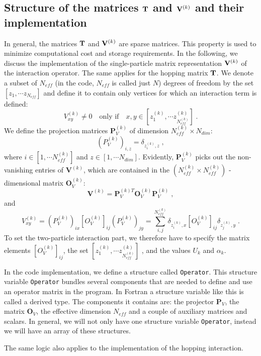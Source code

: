 \subsection{Structure of the matrices ${\bf T}$ and ${\bf V}^{(k)}$ and their implementation}

In general, the matrices ${\bf T}$ and ${\bf V}^{(k)}$ are sparse matrices. 
This property is used to minimize computational cost and storage requirements.
In the following, we discuss the implementation of the single-particle matrix representation ${\bf V}^{(k)}$ of the interaction operator. 
The same applies for the hopping matrix ${\bf T}$.
We denote a subset of $N_{eff}$ (in the code, $N_{eff}$ is called just $N$) degrees of freedom  by the set  $[z_{1},\cdots  z_{N_{eff}}]$ and define it to contain only vertices for which an interaction term is defined:
\begin{equation}
V^{(k)}_{x y}\neq 0\quad \text{only if} \quad x,y \in [z_{1}^{(k)},\cdots  z_{N_{eff}^{(k)}}^{(k)}]\;.
\end{equation}
We define the projection matrices $\mathbf{P}^{(k)}_{V}$ of dimension $N_{eff}^{(k)}\times N_{dim}$:
\begin{equation}
(P_{V}^{(k)})_{i,z}=\delta_{z_{i}^{(k)},z}\;,
\end{equation}
where $i\in [1,\cdots N_{eff}^{(k)}]$ and $z\in [1,\cdots N_{dim}]$. Evidently, $\bm{P}^{(k)}_{V}$ picks out the non-vanishing entries of $\bm{V}^{(k)}$, 
which are contained in the $(N_{eff}^{(k)}\times N_{eff}^{(k)})$ - dimensional matrix $\bm{O}_{V}^{(k)}$:
\begin{equation}
\bm{V}^{(k)}=\bm{P}^{(k) T}_{V} \bm{O}_{V}^{(k)}\bm{P}^{(k)}_{V}\;,
\end{equation}
and
\begin{equation}
V_{xy}^{(k)}=(P^{(k)}_{V})_{ix} \left[O_{V}^{(k)}\right]_{ij}(P_{V}^{(k)})_{jy}=\sum\limits_{i,j}^{N_{eff}^{(k)}} \delta_{z_{i}^{(k)},x}  \left[O_{V}^{(k)}\right]_{ij} \delta_{z_{j}^{(k)},y} \;.
\end{equation}
To set the two-particle interaction part, we therefore have to specify the matrix elements $\left[O_{V}^{(k)}\right]_{ij}$, the set $[z_{1}^{(k)},\cdots  z_{N_{eff}^{(k)}}^{(k)}]$ , and the values $U_{k}$ and $\alpha_{k}$.

In the code implementation, we define a structure called \texttt{Operator}. 
This structure variable \texttt{Operator} bundles several components that are needed to define and use an operator matrix in the program.
In Fortran a structure variable like this is called a derived type. 
The components it contains are: the projector ${\bm P}_{V}$, the matrix ${\bm O}_V$, the effective dimension $N_{eff}$ and a couple of auxiliary matrices and scalars.
In general, we will not only have one structure variable \texttt{Operator}, instead we will have an array of these structures.

The same logic also applies to the implementation of the hopping interaction. 
